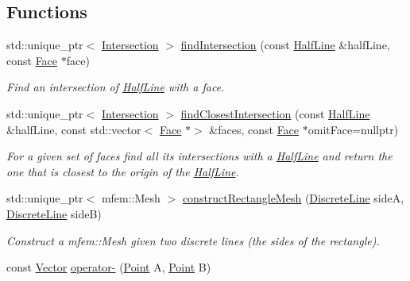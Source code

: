 \subsection*{Functions}
\begin{DoxyCompactItemize}
\item 
std\+::unique\+\_\+ptr$<$ \hyperlink{structraytracer_1_1geometry_1_1Intersection}{Intersection} $>$ \hyperlink{namespaceraytracer_1_1geometry_aef0f9f1bd82ffb69b8d6343a57106234}{find\+Intersection} (const \hyperlink{structraytracer_1_1geometry_1_1HalfLine}{Half\+Line} \&half\+Line, const \hyperlink{classraytracer_1_1geometry_1_1Face}{Face} $\ast$face)
\begin{DoxyCompactList}\small\item\em Find an intersection of \hyperlink{structraytracer_1_1geometry_1_1HalfLine}{Half\+Line} with a face. \end{DoxyCompactList}\item 
std\+::unique\+\_\+ptr$<$ \hyperlink{structraytracer_1_1geometry_1_1Intersection}{Intersection} $>$ \hyperlink{namespaceraytracer_1_1geometry_ae05eacb910ded12afa671c5563e91b11}{find\+Closest\+Intersection} (const \hyperlink{structraytracer_1_1geometry_1_1HalfLine}{Half\+Line} \&half\+Line, const std\+::vector$<$ \hyperlink{classraytracer_1_1geometry_1_1Face}{Face} $\ast$$>$ \&faces, const \hyperlink{classraytracer_1_1geometry_1_1Face}{Face} $\ast$omit\+Face=nullptr)
\begin{DoxyCompactList}\small\item\em For a given set of faces find all its intersections with a \hyperlink{structraytracer_1_1geometry_1_1HalfLine}{Half\+Line} and return the one that is closest to the origin of the \hyperlink{structraytracer_1_1geometry_1_1HalfLine}{Half\+Line}. \end{DoxyCompactList}\item 
std\+::unique\+\_\+ptr$<$ mfem\+::\+Mesh $>$ \hyperlink{namespaceraytracer_1_1geometry_a8d4b7f6d4fec35e4deeb09ec86b3d140}{construct\+Rectangle\+Mesh} (\hyperlink{structraytracer_1_1geometry_1_1DiscreteLine}{Discrete\+Line} sideA, \hyperlink{structraytracer_1_1geometry_1_1DiscreteLine}{Discrete\+Line} sideB)
\begin{DoxyCompactList}\small\item\em Construct a mfem\+::\+Mesh given two discrete lines (the sides of the rectangle). \end{DoxyCompactList}\item 
const \hyperlink{classraytracer_1_1geometry_1_1Vector}{Vector} \hyperlink{namespaceraytracer_1_1geometry_a019177298d61bc227f55b0d51a83f60e}{operator-\/} (\hyperlink{classraytracer_1_1geometry_1_1Point}{Point} A, \hyperlink{classraytracer_1_1geometry_1_1Point}{Point} B)
$$
\end{DoxyCompactItemize}

